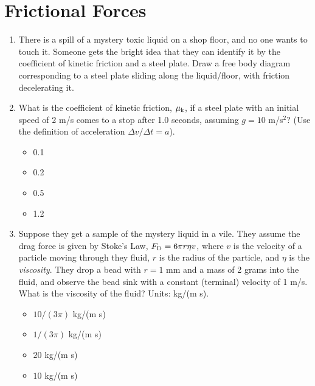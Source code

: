 \documentclass[10pt]{article}
\begin{document}
\section{Frictional Forces}
\begin{enumerate}
\item There is a spill of a mystery toxic liquid on a shop floor, and no one wants to touch it.  Someone gets the bright idea that they can identify it by the coefficient of kinetic friction and a steel plate.  Draw a free body diagram corresponding to a steel plate sliding along the liquid/floor, with friction decelerating it.\vspace{2.5cm}
\item What is the coefficient of kinetic friction, $\mu_{\rm k}$, if a steel plate with an initial speed of 2 m/s comes to a stop after 1.0 seconds, assuming $g = 10$ m/s$^2$?  (Use the definition of acceleration $\Delta v/\Delta t = a$).
\begin{itemize}
\item 0.1
\item 0.2
\item 0.5
\item 1.2
\end{itemize}
\item Suppose they get a sample of the mystery liquid in a vile.  They assume the drag force is given by Stoke's Law, $F_{\rm D} = 6\pi r \eta v$, where $v$ is the velocity of a particle moving through they fluid, $r$ is the radius of the particle, and $\eta$ is the \textit{viscosity}.  They drop a bead with $r = 1$ mm and a mass of 2 grams into the fluid, and observe the bead sink with a constant (terminal) velocity of 1 m/s.  What is the viscosity of the fluid?  Units: kg/(m s).
\begin{itemize}
\item $10/(3\pi)$ kg/(m s)
\item $1/(3\pi)$ kg/(m s)
\item $20$ kg/(m s)
\item $10$ kg/(m s)
\end{itemize}
\end{enumerate}
\end{document}
